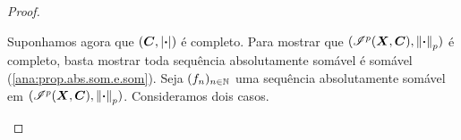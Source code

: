 \begin{proof}
\begin{enumerate}
Suponhamos agora que $(\bm C,\left\vert{\bm{\cdot}}\right\vert)$ é completo. Para mostrar que $(\mathscr{I}^p(\bm X,\bm C),\left\Vert{\bm{\cdot}}\right\Vert_p)$ é completo, basta mostrar toda sequência absolutamente somável é somável (\ref{ana:prop.abs.som.e.som}). Seja $(f_n)_{n \in \mathbb{N}}$ uma sequência absolutamente somável em $(\mathscr{I}^p(\bm X,\bm C),\left\Vert{\bm{\cdot}}\right\Vert_p)$. Consideramos dois casos.
	\begin{enumerate}

	\begin{comment}
	
	\item Para $p \in \intfa{1}{\infty}$. Seja
		\begin{equation*}
		 M := \sum_{k \in \N} \nor{f_k}_p.
		 \end{equation*}
Segue da subaditividade de $\nor{\var}_p$ que, para todo $n \in \N$,
		\begin{equation*}
		\nor{\sum_{k \in [n]} \abs{f_k}}_p \leq \sum_{k \in [n]} \nor{f_k}_p \leq M < \infty,
		\end{equation*}
portanto
	\begin{equation*}
	\int \left( \sum_{k \in [n]} \abs{f_k} \right)^p \dd\med \leq M^p.
	\end{equation*}
Temos que, para todo $n \in \N$,
	\begin{equation*}
	0 \leq \sum_{k \in [n]} \abs{f_k} \leq \sum_{k \in [n+1]} \abs{f_k},
	\end{equation*}
logo o limite pontual $\sum_{k \in \N} \abs{f_k}$ tem valores em $\intff{0}{\infty}$ e é mensurável. Pelo teorema da convergência monótona temos que
	\begin{equation*}
	\int \left( \sum_{k \in \N} \abs{f_k} \right)^p \dd\med \leq M^p.
	\end{equation*}
Portanto $\left( \sum_{k \in \N} \abs{f_k} \right)^p$ é integrável e, para quase todo $x \in X$, $\sum_{k \in \N} \abs{f_k(x)} \in \intfa{0}{\infty}$. Assim, para quase todo todo $x \in X$, a sequência $(f_k(x))_{n \in \N}$ é absolutamente somável em $\bm C$, portanto é somável e está definido o limite pontual
	\begin{equation*}
	s(x) := \sum_{k \in \N} f_k(x).
	\end{equation*}
A função $s$ está definida para quase todo $x \in X$, é mensurável e, para todo $n \in \N$, segue da continuidade e da subaditividade de $\abs{\var}$ que
	\begin{equation*}
	\abs{s} = \lim_{n \to \infty} \abs{\sum_{k \in [n]} f_k} \leq \lim_{n \to \infty} \sum_{k \in [n]} \abs{f_k} \leq \sum_{k \in \N} \abs{f_k},
	\end{equation*}
portanto
	\begin{equation*}
	\nor{s}_p = \left( \int \abs{s}^p \dd\med \right)^{p^{-1}} \leq \left( \int \abs{\sum_{k \in \N} \abs{f_k}}^p \dd\med \right)^{p^{-1}} = \nor{\sum_{k \in \N} \abs{f_k}}_p,
	\end{equation*}
o que mostra que $s \in \Intg^p(\bm X, \bm C)$.



\end{comment}
\end{enumerate}
\end{enumerate}
\end{proof}
